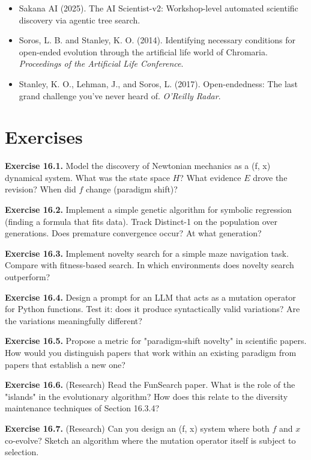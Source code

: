 \begin{itemize}
\item Sakana AI (2025). The AI Scientist-v2: Workshop-level automated scientific discovery via agentic tree search.
\end{itemize}

\begin{itemize}
\item Soros, L. B. and Stanley, K. O. (2014). Identifying necessary conditions for open-ended evolution through the artificial life world of Chromaria. \textit{Proceedings of the Artificial Life Conference}.
\end{itemize}

\begin{itemize}
\item Stanley, K. O., Lehman, J., and Soros, L. (2017). Open-endedness: The last grand challenge you've never heard of. \textit{O'Reilly Radar}.
\end{itemize}



\section{Exercises}

\textbf{Exercise 16.1.} Model the discovery of Newtonian mechanics as a (f, x) dynamical system. What was the state space $H$? What evidence $E$ drove the revision? When did $f$ change (paradigm shift)?

\textbf{Exercise 16.2.} Implement a simple genetic algorithm for symbolic regression (finding a formula that fits data). Track Distinct-1 on the population over generations. Does premature convergence occur? At what generation?

\textbf{Exercise 16.3.} Implement novelty search for a simple maze navigation task. Compare with fitness-based search. In which environments does novelty search outperform?

\textbf{Exercise 16.4.} Design a prompt for an LLM that acts as a mutation operator for Python functions. Test it: does it produce syntactically valid variations? Are the variations meaningfully different?

\textbf{Exercise 16.5.} Propose a metric for "paradigm-shift novelty" in scientific papers. How would you distinguish papers that work within an existing paradigm from papers that establish a new one?

\textbf{Exercise 16.6.} (Research) Read the FunSearch paper. What is the role of the "islands" in the evolutionary algorithm? How does this relate to the diversity maintenance techniques of Section 16.3.4?

\textbf{Exercise 16.7.} (Research) Can you design an (f, x) system where both $f$ and $x$ co-evolve? Sketch an algorithm where the mutation operator itself is subject to selection.

